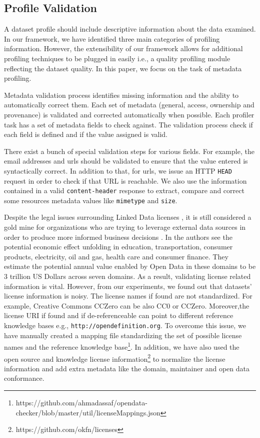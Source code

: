 \documentclass[runningheads,a4paper]{llncs}
\begin{document}
\subsection{Profile Validation}

A dataset profile should include descriptive information about the data examined. In our framework, we have identified three main categories of profiling information. However, the extensibility of our framework allows for additional profiling techniques to be plugged in easily i.e., a quality profiling module reflecting the dataset quality. In this paper, we focus on the task of metadata profiling.

Metadata validation process identifies missing information and the ability to automatically correct them. Each set of metadata (general, access, ownership and provenance) is validated and corrected automatically when possible. Each profiler task has a set of metadata fields to check against. The validation process check if each field is defined and if the value assigned is valid.

There exist a bunch of special validation steps for various fields. For example, the email addresses and urls should be validated to ensure that the value entered is syntactically correct. In addition to that, for urls, we issue an HTTP \texttt{HEAD} request in order to check if that URL is reachable. We also use the information contained in a valid \texttt{content-header} response to extract, compare and correct some resources metadata values like \texttt{mimetype} and \texttt{size}.

Despite the legal issues surrounding Linked Data licenses \cite{nomoneyLOD}, it is still considered a gold mine for organizations who are trying to leverage external data sources in order to produce more informed business decisions \cite{Boyd2011}. In \cite{mckinseyreport} the authors see the potential economic effect unfolding in education, transportation, consumer products, electricity, oil and gas, health care and consumer finance. They estimate the potential annual value enabled by Open Data in these domains to be 3 trillion US Dollars across seven domains. As a result, validating license related information is vital. However, from our experiments, we found out that datasets' license information is noisy. The license names if found are not standardized. For example, Creative Commons CCZero can be also CC0 or CCZero. Moreover,the license URI if found and if de-referenceable can point to different reference knowledge bases e.g., \texttt{http://opendefinition.org}. To overcome this issue, we have manually created a mapping file standardizing the set of possible license names and the reference knowledge base\footnote{https://github.com/ahmadassaf/opendata-checker/blob/master/util/licenseMappings.json}. In addition, we have also used the open source and knowledge license information\footnote{https://github.com/okfn/licenses} to normalize the license information and add extra metadata like the domain, maintainer and open data conformance.
\end{document}

